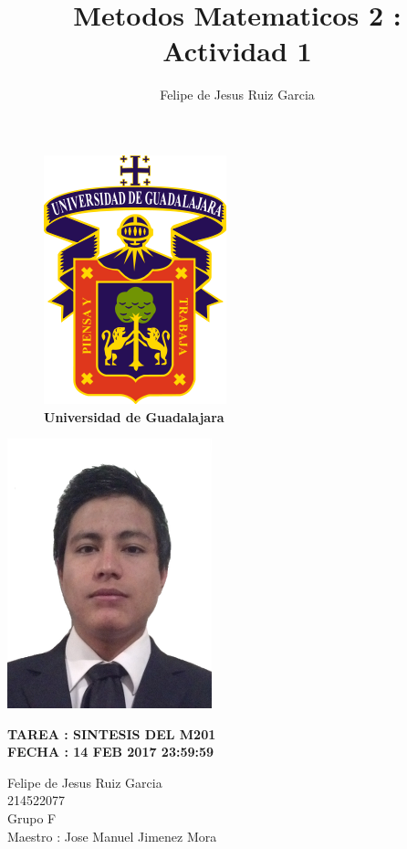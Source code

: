 \documentclass[12pt,a4paper]{book}
\author{Felipe de Jesus Ruiz Garcia}
\title{Metodos Matematicos 2 : Actividad 1}
\begin{document}
\begin{figure}[hbtp]
\centering
\includegraphics[scale=.5]{../PRE/udg.png}\\
 \textbf{Universidad de Guadalajara}
\end{figure}

\begin{center}
\includegraphics[scale=.5]{../PRE/profile.png}\\
\end{center}

\begin{center}
\textbf{TAREA : SINTESIS DEL M201 \\}
\textbf{FECHA : 14 FEB 2017 23:59:59 \\}

Felipe de Jesus Ruiz Garcia 
\\ 214522077
\\ Grupo F  
\\ Maestro :  Jose Manuel Jimenez Mora

\end{center}
 \bigskip

\begin{figure}[hbtp]
\centering

\end{figure}
\begin{center}
\end{center}
\end{document}
